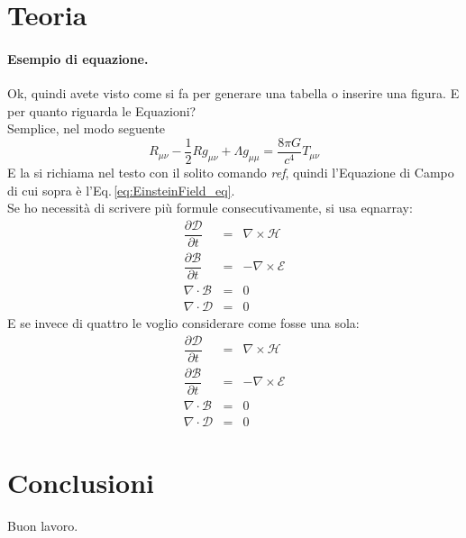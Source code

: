 \section{Teoria}\label{Sec:Teoria}
\paragraph{Esempio di equazione.} %
Ok, quindi avete visto come si fa per generare una tabella o inserire una figura. E per quanto riguarda le Equazioni?\\
Semplice, nel modo seguente
\begin{equation}\label{eq:EinsteinField_eq}
R_{\mu \nu} - \dfrac{1}{2} R g_{\mu \nu} + \Lambda g_{\mu \mu} = \dfrac{8 \pi G}{c^4} T_{\mu \nu}
\end{equation}
E la si richiama nel testo con il solito comando {\it ref}, quindi l'Equazione di Campo di cui sopra è l'Eq.\,\ref{eq:EinsteinField_eq}.\\
Se ho necessità di scrivere più formule consecutivamente, si usa eqnarray:
\begin{eqnarray}
\dfrac{\partial \mathcal D}{\partial t} &=& \nabla \times \mathcal H \\
\dfrac{\partial \mathcal B}{\partial t} &=& -\nabla \times \mathcal E \\
\nabla \cdot \mathcal B  &=& 0 \\
\nabla \cdot \mathcal D  &=& 0 
\end{eqnarray}
E se invece di quattro le voglio considerare come fosse una sola:
\begin{eqnarray}\label{eq:Maxwell_eq}
\dfrac{\partial \mathcal D}{\partial t} &=& \nabla \times \mathcal H \nonumber \\
\dfrac{\partial \mathcal B}{\partial t} &=& -\nabla \times \mathcal E \nonumber \\
\nabla \cdot \mathcal B  &=& 0 \nonumber \\
\nabla \cdot \mathcal D  &=& 0 
\end{eqnarray}

\section{Conclusioni}\label{Sec:Conclusioni}
Buon lavoro.
